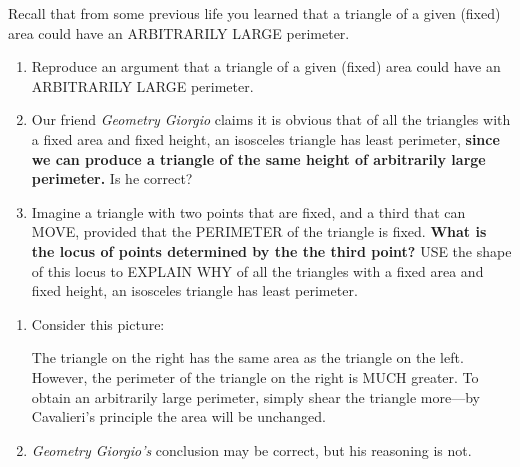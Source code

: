 \documentclass[nooutcomes,noauthor,hints,handout]{ximera}
\begin{document}
\begin{question}
  Recall that from some previous life you learned that a triangle of a
  given (fixed) area could have an ARBITRARILY LARGE perimeter.
  \begin{enumerate}
  \item Reproduce an argument that a triangle of a given (fixed) area
    could have an ARBITRARILY LARGE perimeter.
  \item Our friend \textit{Geometry Giorgio} claims it is obvious that of all the
    triangles with a fixed area and fixed height, an isosceles triangle
    has least perimeter, \textbf{since we can produce a triangle of the same height
      of arbitrarily large perimeter.} Is he correct?
  \item Imagine a triangle with two points that are fixed, and a third
    that can MOVE, provided that the PERIMETER of the triangle is
    fixed. \textbf{What is the locus of points determined by the the third
    point?} USE the shape of this locus to EXPLAIN WHY of all the
    triangles with a fixed area and fixed height, an isosceles triangle
    has least perimeter.
  \end{enumerate}
  \begin{freeResponse}
    \begin{enumerate}
    \item Consider this picture:
      \begin{center}
      \end{center}
      The triangle on the right has the same area as the triangle on
      the left. However, the perimeter of the triangle on the right is
      MUCH greater.  To obtain an arbitrarily large perimeter, simply
      shear the triangle more---by Cavalieri's principle the area will
      be unchanged.
    \item \textit{Geometry Giorgio's} conclusion may be correct, but his
      reasoning is not. 
      \begin{center}
\end{center}
\end{enumerate}
\end{freeResponse}
\end{question}
\end{document}
